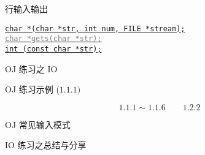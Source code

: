 \begin{frame}{行输入输出}
  \begin{center}
    \href{http://www.cplusplus.com/reference/cstdio/fgets/}
    {\texttt{char *(char *str, int num, FILE *stream);}}  \\[0.30cm]

    \href{http://www.cplusplus.com/reference/cstdio/gets/}{\texttt{\textcolor{gray}{char *gets(char *str);}}}  \\[0.50cm]

    \href{http://www.cplusplus.com/reference/cstdio/puts/}
    {\texttt{int (const char *str);}}
  \end{center}
\end{frame}

\begin{frame}{OJ 练习之 IO}
  \centerline{OJ 练习示例 ($1.1.1)$}

  \vspace{0.80cm}
  \pause
  \[
    1.1.1 \sim 1.1.6 \qquad 1.2.2
  \]
\end{frame}

\begin{frame}{OJ 常见输入模式}
  \centerline{IO 练习之总结与分享}
\end{frame}

